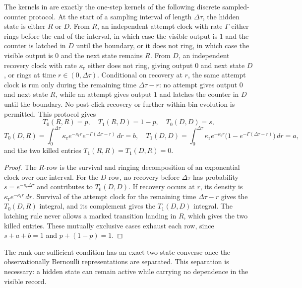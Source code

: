 \begin{lemma}\label{lem:classical-counter-kernel-construction-main}
The kernels in  are exactly the
one-step kernels of the following discrete sampled-counter protocol.  At the
start of a sampling interval of length \(\Delta\tau\), the hidden state is
either \(R\) or \(D\).  From \(R\), an independent attempt clock with rate
\(\Gamma\) either rings before the end of the interval, in which case the
visible output is \(1\) and the counter is latched in \(D\) until the boundary,
or it does not ring, in which case the visible output is \(0\) and the next
state remains \(R\).
From \(D\), an independent recovery clock with rate \(\kappa_{\mathrm r}\)
either does not ring, giving output \(0\) and next state \(D\), or rings at
time \(r\in(0,\Delta\tau)\).  Conditional on recovery at \(r\), the same
attempt clock is run only during the remaining time \(\Delta\tau-r\): no
attempt gives output \(0\) and next state \(R\), while an attempt gives output
\(1\) and latches the counter in \(D\) until the boundary.  No post-click
recovery or further within-bin evolution is permitted.  This protocol gives
\[
T_0(R,R)=p,\quad T_1(R,D)=1-p,\quad T_0(D,D)=s,
\]
\[
T_0(D,R)=\int_0^{\Delta\tau}\kappa_{\mathrm r}e^{-\kappa_{\mathrm r}r}
e^{-\Gamma(\Delta\tau-r)}\,dr=b,
\quad
T_1(D,D)=\int_0^{\Delta\tau}\kappa_{\mathrm r}e^{-\kappa_{\mathrm r}r}
\bigl(1-e^{-\Gamma(\Delta\tau-r)}\bigr)\,dr=a,
\]
and the two killed entries \(T_1(R,R)=T_1(D,R)=0\).
\end{lemma}

\begin{proof}
The \(R\)-row is the survival and ringing decomposition of an exponential
clock over one interval.  For the \(D\)-row, no recovery before
\(\Delta\tau\) has probability \(s=e^{-\kappa_{\mathrm r}\Delta\tau}\) and
contributes to \(T_0(D,D)\).  If recovery occurs at \(r\), its density is
\(\kappa_{\mathrm r}e^{-\kappa_{\mathrm r}r}\,dr\).  Survival of the attempt
clock for the remaining time \(\Delta\tau-r\) gives the \(T_0(D,R)\) integral,
and its complement gives the \(T_1(D,D)\) integral.  The latching rule never
allows a marked transition landing in \(R\), which gives the two killed
entries.  These mutually exclusive cases exhaust each row, since
\(s+a+b=1\) and \(p+(1-p)=1\).
\end{proof}

The rank-one sufficient condition has an exact two-state converse once the
observationally Bernoulli representations are separated.  This separation is
necessary: a hidden state can remain active while carrying no dependence in
the visible record.

